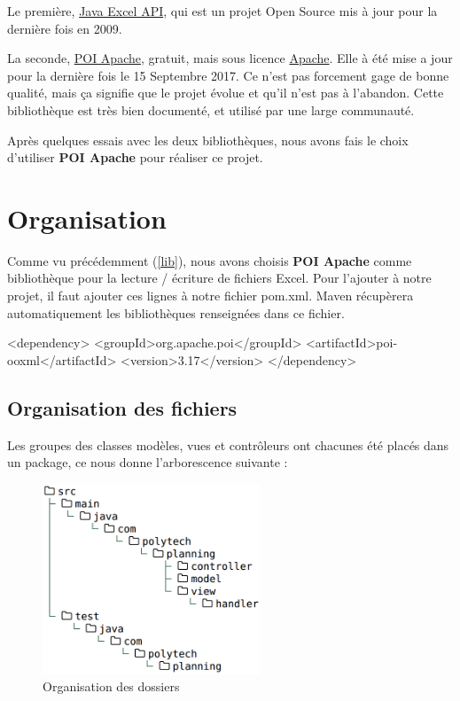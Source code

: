 \documentclass{polytech/polytech}
\begin{document}
	Le première, \href{http://jexcelapi.sourceforge.net/}{Java Excel API}, qui est un projet Open Source mis à jour pour la dernière fois en 2009.

	\label{lib}
	La seconde, \href{http://poi.apache.org}{POI Apache}, gratuit, mais sous licence \href{https://www.apache.org/licenses/}{Apache}.
	Elle à été mise a jour pour la dernière fois le 15 Septembre 2017.
	Ce n'est pas forcement gage de bonne qualité, mais ça signifie que le projet évolue et qu'il n'est pas à l'abandon.
	Cette bibliothèque est très bien documenté, et utilisé par une large communauté.

	Après quelques essais avec les deux bibliothèques, nous avons fais le choix d'utiliser \textbf{POI Apache} pour réaliser ce projet.

	\section{Organisation}

	Comme vu précédemment (\ref{lib}), nous avons choisis \textbf{POI Apache} comme bibliothèque pour la lecture / écriture de fichiers Excel.
	Pour l'ajouter à notre projet, il faut ajouter ces lignes à notre fichier pom.xml.
	Maven récupèrera automatiquement les bibliothèques renseignées dans ce fichier.

	\begin{latexsource}
	<dependency>
		<groupId>org.apache.poi</groupId>
		<artifactId>poi-ooxml</artifactId>
		<version>3.17</version>
	</dependency>
	\end{latexsource}

	\pagebreak

	\subsection{Organisation des fichiers}

	Les groupes des classes modèles, vues et contrôleurs ont chacunes été placés dans un package, ce nous donne l'arborescence suivante :

	\begin{figure}
		\caption{Organisation des dossiers}
		\includegraphics[width=6.5cm]{./img/folder-planning-w.png}
	\end{figure}
\end{document}
